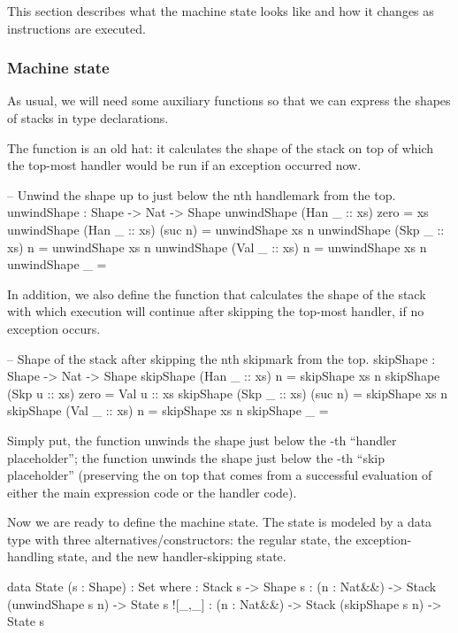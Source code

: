 This section describes what the machine state looks like and how it changes as
instructions are executed.

\subsubsection{Machine state}\label{sec:lin-machine-state}

As usual, we will need some auxiliary functions so that we can express the
shapes of stacks in type declarations.

The function  is an old hat: it calculates the shape of the stack
on top of which the top-most handler would be run if an exception occurred now.
\begin{code}
  -- Unwind the shape up to just below the n\-th handle\-mark from the top.
  unwindShape : Shape -> Nat -> Shape
  unwindShape (Han _ :: xs)  zero   = xs
  unwindShape (Han _ :: xs) (suc n) = unwindShape xs n
  unwindShape (Skp _ :: xs)  n      = unwindShape xs n
  unwindShape (Val _ :: xs)  n      = unwindShape xs n
  unwindShape \NIL            _      = \NIL
\end{code}

\noindent In addition, we also define the function  that calculates
the shape of the stack with which execution will continue after skipping
the top-most handler, if no exception occurs.
\\ \begin{minipage}{\textwidth}
\begin{code}
  -- Shape of the stack after skipping the n\-th skip\-mark from the top.
  skipShape : Shape -> Nat -> Shape
  skipShape (Han _ :: xs)  n      = skipShape xs n
  skipShape (Skp u :: xs)  zero   = Val u :: xs
  skipShape (Skp _ :: xs) (suc n) = skipShape xs n
  skipShape (Val _ :: xs)  n      = skipShape xs n
  skipShape \NIL            _      = \NIL
\end{code}\end{minipage}

\noindent Simply put, the function  unwinds the shape just
below the -th ``handler placeholder''; the function 
unwinds the shape just below the -th ``skip placeholder'' (preserving
the  on top that comes from a successful evaluation of either the
main expression code or the handler code).

Now we are ready to define the machine state. The state is modeled by a data
type with three alternatives/constructors: the regular state, the
exception-handling state, and the new handler-skipping state.
\begin{code}
  data State (s : Shape) : Set where
    \tick[_] : Stack s -> Shape s
    \x[_,_] : (n : Nat&\!&) -> Stack (unwindShape s n) -> State s
    ![_,_] : (n : Nat&\!&) -> Stack (skipShape s n) -> State s
\end{code}

